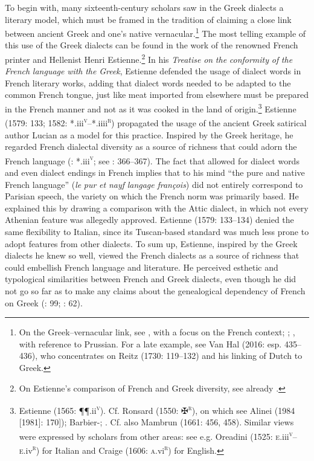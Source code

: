 \documentclass[output=paper]{langsci/langscibook}
\begin{document}
To begin with, many sixteenth-century scholars saw in the Greek dialects a literary model, which must be framed in the tradition of claiming a close link between ancient Greek and one’s native vernacular.\footnote{On the Greek–vernacular link, see \citet{Demaizière1982}, with a focus on the French context; \citet{Trapp1990}; \citet{Dini2004}, with reference to Prussian. For a late example, see Van Hal (2016: esp. 435–436), who concentrates on Reitz (1730: 119–132) and his linking of Dutch to Greek.} The most telling example of this use of the Greek dialects can be found in the work of the renowned French printer and Hellenist Henri Estienne.\footnote{On Estienne’s comparison of French and Greek diversity, see already \citet[70]{Demaizière1988}.} In his \textit{Treatise} \textit{on} \textit{the} \textit{conformity} \textit{of} \textit{the} \textit{French} \textit{language} \textit{with} \textit{the} \textit{Greek}, Estienne defended the usage of dialect words in French literary works, adding that dialect words needed to be adapted to the common French tongue, just like meat imported from elsewhere must be prepared in the French manner and not as it was cooked in the land of origin.\footnote{Estienne (1565: ¶¶.ii\textsc{\textsuperscript{v}}). Cf. Ronsard (1550: ✠\textsc{\textsuperscript{r}}), on which see Alinei (1984 [1981]: 170]); Barbier-\citet[24]{Mueller1990}; \citet[14]{Trapp1990}. Cf. also Mambrun (1661: 456, 458). Similar views were expressed by scholars from other areas: see e.g. Oreadini (1525: \textsc{e.}iii\textsc{\textsuperscript{v}}–\textsc{e.}iv\textsc{\textsuperscript{r}}) for Italian and Craige (1606: \textsc{a}.vi\textsc{\textsuperscript{r}}) for English.} Estienne (1579: 133; 1582: *.iii\textsc{\textsuperscript{v}}–*.iiii\textsc{\textsuperscript{r}}) propagated the usage of the ancient Greek satirical author Lucian as a model for this practice. Inspired by the Greek heritage, he regarded French dialectal diversity as a source of richness that could adorn the French language (\citealt{Estienne1582}: *.iii\textsc{\textsuperscript{v}}; see \citealt{AurouxClerico1992}: 366–367). The fact that \citet[143]{Estienne1579} allowed for dialect words and even dialect endings in French implies that to his mind “the pure and native French language” (\textit{le} \textit{pur} \textit{et} \textit{nayf} \textit{langage} \textit{françois}) did not entirely correspond to Parisian speech, the variety on which the French norm was primarily based. He explained this by drawing a comparison with the Attic dialect, in which not every Athenian feature was allegedly approved. Estienne (1579: 133–134) denied the same flexibility to Italian, since its Tuscan-based standard was much less prone to adopt features from other dialects. To sum up, Estienne, inspired by the Greek dialects he knew so well, viewed the French dialects as a source of richness that could embellish French language and literature. He perceived esthetic and typological similarities between French and Greek dialects, even though he did not go so far as to make any claims about the genealogical dependency of French on Greek (\citealt{Droixhe1978}: 99; \citealt{Considine2008a}: 62).
\end{document}
